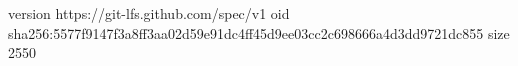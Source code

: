 version https://git-lfs.github.com/spec/v1
oid sha256:5577f9147f3a8ff3aa02d59e91dc4ff45d9ee03cc2c698666a4d3dd9721dc855
size 2550

